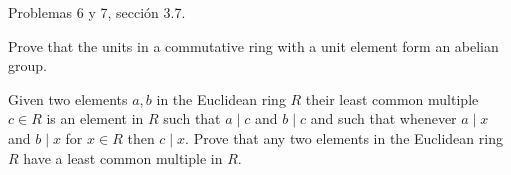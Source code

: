




Problemas 6 y 7, sección 3.7.

\begin{problema}[Problema 6]
    Prove that the units in a commutative ring with a unit element form an abelian group.
    \begin{dem}
    \end{dem}
\end{problema}

\begin{problema}[Problema 7]
    Given two elements $a, b$ in the Euclidean ring $R$ their least common multiple $c \in R$ is an element in $R$ such that $a \mid c$ and $b \mid c$ and such that whenever $a \mid x$ and $b \mid x$ for $x \in R$ then $c \mid x$. Prove that any two elements in the Euclidean ring $R$ have a least common multiple in $R$.
    \begin{dem}
    \end{dem}
\end{problema}

%
%

